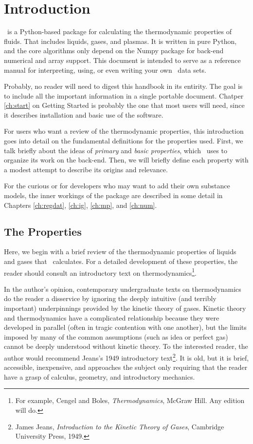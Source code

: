 \chapter{Introduction}

\PM\ is a Python-based package for calculating the thermodynamic properties of fluids.  That includes liquids, gases, and plasmas.  It is written in pure Python, and the core algorithms only depend on the Numpy package for back-end numerical and array support.  This document is intended to serve as a reference manual for interpreting, using, or even writing your own \PM\ data sets.  

Probably, no reader will need to digest this handbook in its entirity.  The goal is to include all the important information in a single portable document.  Chatper \ref{ch:start} on Getting Started is probably the one that most users will need, since it describes installation and basic use of the software.

For users who want a review of the thermodynamic properties, this introduction goes into detail on the fundamental definitions for the properties used.  First, we talk briefly about the ideas of \emph{primary} and \emph{basic properties}, which \PM\ uses to organize its work on the back-end.  Then, we will briefly define each property with a modest attempt to describe its origins and relevance.

For the curious or for developers who may want to add their own substance models, the inner workings of the package are described in some detail in Chapters \ref{ch:regdat}, \ref{ch:ig}, \ref{ch:mp}, and \ref{ch:num}.

%
%
\section{The Properties}

Here, we begin with a brief review of the thermodynamic properties of liquids and gases that \PM\ calculates.  For a detailed development of these properties, the reader should consult an introductory text on thermodynamics\footnote{For example, Cengel and Boles, \emph{Thermodynamics}, McGraw Hill.  Any edition will do.}.  

In the author's opinion, contemporary undergraduate texts on thermodynamics do the reader a disservice by ignoring the deeply intuitive (and terribly important) underpinnings provided by the kinetic theory of gases.  Kinetic theory and thermodynamics have a complicated relationship because they were developed in parallel (often in tragic contention with one another), but the limits imposed by many of the common assumptions (such as idea or perfect gas) cannot be deeply understood without kinetic theory.  To the interested reader, the author would recommend Jeans's 1949 introductory text\footnote{James Jeans, \emph{Introduction to the Kinetic Theory of Gases}, Cambridge University Press, 1949.}.  It is old, but it is brief, accessible, inexpensive, and approaches the subject only requiring that the reader have a grasp of calculus, geometry, and introductory mechanics.  

